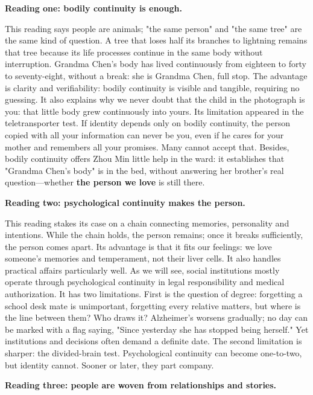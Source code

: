 \textbf{Reading one: bodily continuity is enough.}

This reading says people are animals; "the same person" and "the same tree" are the same kind of question. A tree that loses half its branches to lightning remains that tree because its life processes continue in the same body without interruption. Grandma Chen's body has lived continuously from eighteen to forty to seventy-eight, without a break: she is Grandma Chen, full stop. The advantage is clarity and verifiability: bodily continuity is visible and tangible, requiring no guessing. It also explains why we never doubt that the child in the photograph is you: that little body grew continuously into yours. Its limitation appeared in the teletransporter test. If identity depends only on bodily continuity, the person copied with all your information can never be you, even if he cares for your mother and remembers all your promises. Many cannot accept that. Besides, bodily continuity offers Zhou Min little help in the ward: it establishes that "Grandma Chen's body" is in the bed, without answering her brother's real question---whether \textbf{the person we love} is still there.

\textbf{Reading two: psychological continuity makes the person.}

This reading stakes its case on a chain connecting memories, personality and intentions. While the chain holds, the person remains; once it breaks sufficiently, the person comes apart. Its advantage is that it fits our feelings: we love someone's memories and temperament, not their liver cells. It also handles practical affairs particularly well. As we will see, social institutions mostly operate through psychological continuity in legal responsibility and medical authorization. It has two limitations. First is the question of degree: forgetting a school desk mate is unimportant, forgetting every relative matters, but where is the line between them? Who draws it? Alzheimer's worsens gradually; no day can be marked with a flag saying, "Since yesterday she has stopped being herself." Yet institutions and decisions often demand a definite date. The second limitation is sharper: the divided-brain test. Psychological continuity can become one-to-two, but identity cannot. Sooner or later, they part company.

\textbf{Reading three: people are woven from relationships and stories.}

